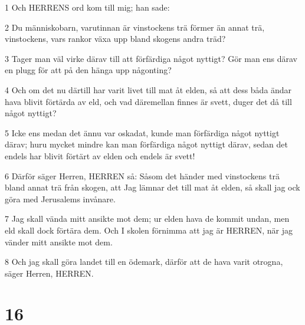 \par 1 Och HERRENS ord kom till mig; han sade:
\par 2 Du människobarn, varutinnan är vinstockens trä förmer än annat trä, vinstockens, vars rankor växa upp bland skogens andra träd?
\par 3 Tager man väl virke därav till att förfärdiga något nyttigt? Gör man ens därav en plugg för att på den hänga upp någonting?
\par 4 Och om det nu därtill har varit livet till mat åt elden, så att dess båda ändar hava blivit förtärda av eld, och vad däremellan finnes är svett, duger det då till något nyttigt?
\par 5 Icke ens medan det ännu var oskadat, kunde man förfärdiga något nyttigt därav; huru mycket mindre kan man förfärdiga något nyttigt därav, sedan det endels har blivit förtärt av elden och endels är svett!
\par 6 Därför säger Herren, HERREN så: Såsom det händer med vinstockens trä bland annat trä från skogen, att Jag lämnar det till mat åt elden, så skall jag ock göra med Jerusalems invånare.
\par 7 Jag skall vända mitt ansikte mot dem; ur elden hava de kommit undan, men eld skall dock förtära dem. Och I skolen förnimma att jag är HERREN, när jag vänder mitt ansikte mot dem.
\par 8 Och jag skall göra landet till en ödemark, därför att de hava varit otrogna, säger Herren, HERREN.

\chapter{16}

